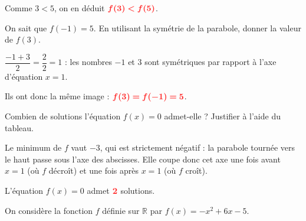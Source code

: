 \documentclass[11pt,a4paper]{article}  %
\begin{document}
\begin{enumMet}
\begin{corrBox}
			Comme $3<5$, on en déduit $\mRouge{f(3)<f(5)}$. \quad {}
		\end{corrBox}

		\item {} On sait que $f(-1)=5$. En utilisant la symétrie de la parabole, donner la valeur de $f(3)$.

		\begin{corrBox}
			$\dfrac{-1+3}{2}=\dfrac{2}{2}=1$ : les nombres $-1$ et $3$ sont symétriques par rapport à l'axe d'équation $x=1$. \quad {}

			Ils ont donc la même image : $\mRouge{f(3)=f(-1)=5}$. \quad {}
		\end{corrBox}

		\item Combien de solutions l'équation $f(x)=0$ admet-elle ? Justifier à l'aide du tableau.

		\begin{corrBox}
			Le minimum de $f$ vaut $-3$, qui est strictement négatif : la parabole \og tournée vers le haut \fg{} passe sous l'axe des abscisses. Elle coupe donc cet axe une fois avant $x=1$ (où $f$ décroît) et une fois après $x=1$ (où $f$ croît).

			L'équation $f(x)=0$ admet $\mRouge{2}$ solutions. \quad \bareme{0,5}

		\end{corrBox}
	\end{enumMet}


	On considère la fonction $f$ définie sur $\mathbb{R}$ par $f(x)=-x^2+6x-5$.
\end{document}
